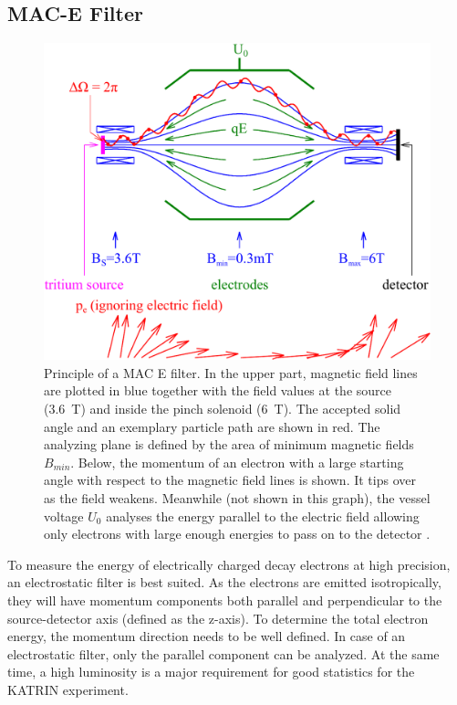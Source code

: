        \subsection{MAC-E Filter}
                   \begin{figure}
	\centering
      	\includegraphics[width = 0.8 \textwidth]{graphics/katrinExperiment/macEFilter.pdf}
      	\caption[MAC E Filter]{Principle of a MAC E filter. In the upper part, magnetic field lines are plotted in blue together with the field values at the source (\SI{3.6}{\tesla}) and inside the pinch solenoid (\SI{6}{\tesla}). The accepted solid angle and an exemplary particle path are shown in red. The analyzing plane is defined by the area of minimum magnetic fields $B_{min}$. Below, the momentum of an electron with a large starting angle with respect to the magnetic field lines is shown. It tips over as the field weakens. Meanwhile (not shown in this graph), the vessel voltage $U_0$ analyses the energy parallel to the electric field allowing only electrons with large enough energies to pass on to the detector \cite{macEFilter}.}
      	\label{fig:katrinExperiment:macEFilter}
      \end{figure}
      \label{ch:The KATRIN experiment:sec:MAC-E}
		To measure the energy of electrically charged decay electrons at high precision, an electrostatic filter is best suited. As the electrons are emitted isotropically, they will have momentum components both parallel and perpendicular to the source-detector axis (defined as the z-axis). To determine the total electron energy, the momentum direction needs to be well defined. In case of an electrostatic filter, only the parallel component can be analyzed.
		At the same time, a high luminosity is a major requirement for good statistics for the KATRIN experiment.
